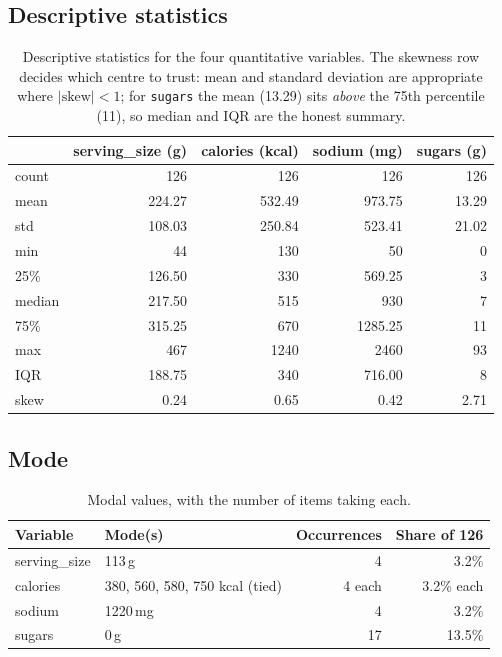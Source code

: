 \documentclass[11pt]{article}
\begin{document}
\subsection*{Descriptive statistics}
\begin{table}[H]\centering\small
\begin{tabular}{l r r r r}
\toprule
 & serving\_size (g) & calories (kcal) & sodium (mg) & sugars (g) \\
\midrule
count   & 126    & 126    & 126     & 126   \\
mean    & 224.27 & 532.49 & 973.75  & 13.29 \\
std     & 108.03 & 250.84 & 523.41  & 21.02 \\
min     & 44     & 130    & 50      & 0     \\
25\%    & 126.50 & 330    & 569.25  & 3     \\
median  & 217.50 & 515    & 930     & 7     \\
75\%    & 315.25 & 670    & 1285.25 & 11    \\
max     & 467    & 1240   & 2460    & 93    \\
IQR     & 188.75 & 340    & 716.00  & 8     \\
skew    & 0.24   & 0.65   & 0.42    & 2.71  \\
\bottomrule
\end{tabular}
\caption{Descriptive statistics for the four quantitative variables.
The skewness row decides which centre to trust: mean and standard deviation are
appropriate where $|\text{skew}| < 1$; for \texttt{sugars} the mean (13.29) sits
\emph{above} the 75th percentile (11), so median and IQR are the honest summary.}
\end{table}

\subsection*{Mode}
\begin{table}[H]\centering\small
\begin{tabular}{l l r r}
\toprule
Variable & Mode(s) & Occurrences & Share of 126 \\
\midrule
serving\_size & 113\,g                         & 4      & 3.2\% \\
calories      & 380, 560, 580, 750 kcal (tied) & 4 each & 3.2\% each \\
sodium        & 1220\,mg                       & 4      & 3.2\% \\
sugars        & 0\,g                           & 17     & 13.5\% \\
\bottomrule
\end{tabular}
\caption{Modal values, with the number of items taking each.}
\end{table}
\end{document}
